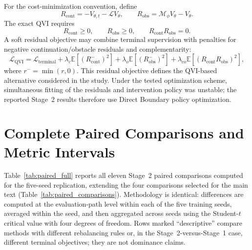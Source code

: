 \documentclass[a4paper,10pt]{article}
\newcommand{\E}{\mathbb{E}}
\begin{document}
For the cost-minimization convention, define
\begin{equation}
R_{\mathrm{cont}}=-V_{\theta,t}-\mathcal LV_\theta,
\qquad
R_{\mathrm{obs}}=\mathcal M_\phi V_\theta-V_\theta.
\end{equation}
The exact QVI requires
\begin{equation}
R_{\mathrm{cont}}\ge0,\qquad R_{\mathrm{obs}}\ge0,\qquad
R_{\mathrm{cont}}R_{\mathrm{obs}}=0.
\end{equation}
A soft residual objective may combine terminal supervision with penalties for negative continuation/obstacle residuals and complementarity:
\begin{equation}
\mathcal L_{\mathrm{QVI}}
=\mathcal L_{\mathrm{terminal}}
+\lambda_c\E[(R_{\mathrm{cont}}^-)^2]
+\lambda_o\E[(R_{\mathrm{obs}}^-)^2]
+\lambda_{co}\E[(R_{\mathrm{cont}}R_{\mathrm{obs}})^2],
\end{equation}
where $r^-=\min(r,0)$. This residual objective defines the QVI-based alternative considered in
the study. Under the tested optimization scheme, simultaneous fitting of
the residuals and intervention policy was unstable; the reported Stage~2
results therefore use Direct Boundary policy optimization.

\section{Complete Paired Comparisons and Metric Intervals}
\label{app:paired_full}

Table~\ref{tab:paired_full} reports all eleven Stage~2 paired comparisons computed for the five-seed replication, extending the four comparisons selected for the main text (Table~\ref{tab:paired_comparisons}). Methodology is identical: differences are computed at the evaluation-path level within each of the five training seeds, averaged within the seed, and then aggregated across seeds using the Student-$t$ critical value with four degrees of freedom. Rows marked ``descriptive'' compare methods with different rebalancing rules or, in the Stage~2-versus-Stage~1 case, different terminal objectives; they are not dominance claims.
\end{document}
